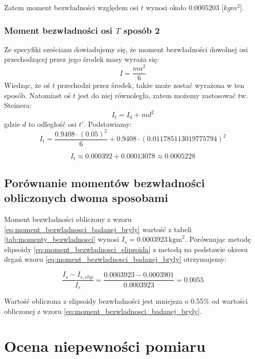 \documentclass[a4paper,12pt]{article}
\begin{document}
Zatem moment bezwładności względem osi $t$ wynosi około $0.0005203$ [$kgm^2$].

\subsubsection*{Moment bezwładności osi $T$ sposób 2}

Ze specyfiki sześcianu dowiadujemy się, że moment bezwładności dowolnej osi przechodzącej przez jego środek masy wyraża się:
\[
    I = \frac{ma^2}{6}
\]
Wiedząc, że oś $t$ przechodzi przez środek, także może zostać wyrażona w ten sposób. Natomiast oś $t$ jest do niej równoległa, zatem możemy zastosować tw. Steinera:
\[
    I_t = I_0 + md^2
\]
gdzie $d$ to odległość osi $t'$.
Podstawiamy:
\[
    I_t = \frac{0.9408 \cdot (0.05)^2}{6} + 0.9408 \cdot (0.011785113019775794)^2
\]

\[
    I_t \approx 0.000392 + 0.00013078 \approx 0.0005228
\]





\subsection{Porównanie momentów bezwładności obliczonych dwoma sposobami}

Moment bezwładności obliczony z wzoru \eqref{eq:moment_bezwladnosci_badanej_bryly} wartość z tabeli \ref{tab:momenty_bezwladnosci} wynosi $I_s = 0.0003923\,\text{kgm}^2$.
Porównując metodę elipsoidy \eqref{eq:moment_bezwladnosci_elipsoida} z metodą na podstawie okresu   drgań wzoru \eqref{eq:moment_bezwladnosci_badanej_bryly} otrzymujemy:

\begin{equation*}
    \frac{I_s - I_{s,elip}}{I_s} = \frac{0.0003923 - 0.0003901}{0.0003923} = 0.0055
\end{equation*}

Wartość obliczona z elipsoidy bezwładności jest mniejsza o 0.55\% od wartości obliczonej z wzoru \eqref{eq:moment_bezwladnosci_badanej_bryly}.








\section{Ocena niepewności pomiaru}
\end{document}
